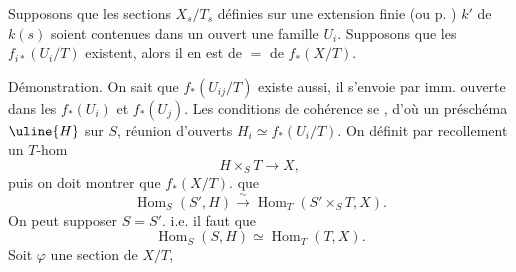   Supposons que les sections $X_s/T_s$ définies sur une extension finie (ou p. ) $k'$ de $k(s)$ soient contenues dans un ouvert   une famille $U_i$.
Supposons que les $f_{i*}(U_i/T)$ existent, alors il en est de $=$ de $f_*(X/T)$.

Démonstration. On  sait que $f_*(U_{ij}/T)$ existe aussi, il s'envoie par imm. ouverte dans les $f_*(U_i)$ et $f_*(U_j)$. Les conditions de cohérence se , d'où un préschéma $\uline{H}$ sur $S$,  réunion d'ouverts $H_i\simeq f_*(U_i/T)$.
On définit par recollement un $T$-hom
\[
H\times_S T\longrightarrow X,
\]
puis on doit montrer que  $f_*(X/T)$.
  que
\[
\operatorname{Hom}_S(S',H)\xrightarrow{\sim}\operatorname{Hom}_T(S'\times_S T,X).
\]
On peut supposer $S=S'$.
i.e. il faut que
\[
\operatorname{Hom}_S(S,H)\simeq\operatorname{Hom}_T(T,X).
\]
Soit $\varphi$ une section de $X/T$,

